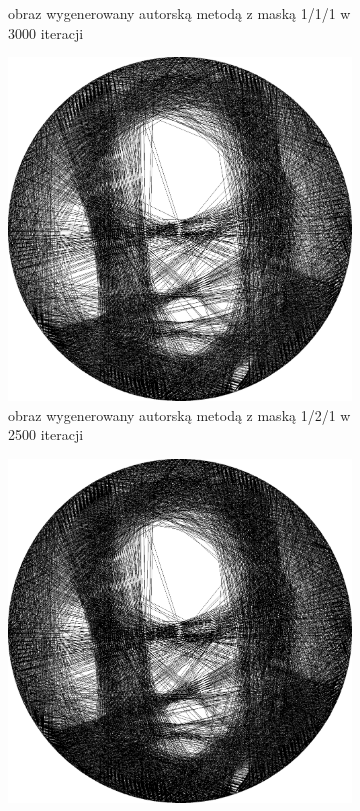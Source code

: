 \begin{figure}[H]
\begin{subfigure}{0.24\textwidth}
            \caption{obraz wygenerowany autorską metodą z maską 1/1/1 w 3000 iteracji}
            \label{comp-comp-churchill-e}
        \end{subfigure}
        \begin{subfigure}{0.24\textwidth}
            \centering
            \includegraphics[width = \textwidth]{img/6-comp/churchill_e_i2500_c20_inv0_bg1_obj2_ed1.png}
            \caption{obraz wygenerowany autorską metodą z maską 1/2/1 w 2500 iteracji}
            \label{comp-comp-churchill-g}
        \end{subfigure}
        \begin{subfigure}{0.24\textwidth}
            \centering
            \includegraphics[width = \textwidth]{img/6-comp/churchill_e_i3000_c20_inv0_bg1_obj2_ed1.png}

\end{subfigure}
\end{figure}
